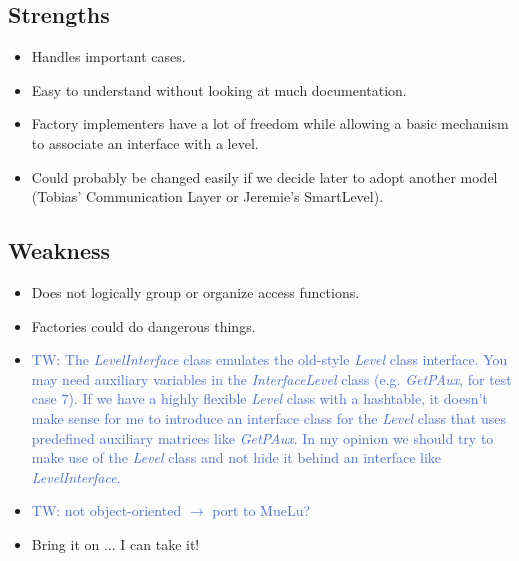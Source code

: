\documentclass{siamltex}
\numberwithin{algorithm}{section}  %
\newcommand{\TW}[1]{\textcolor{RoyalBlue}{TW: #1}}
\begin{document}
\subsection{Strengths}
\begin{itemize}
\item Handles important cases.
\item Easy to understand without looking at much documentation.
\item Factory implementers have a lot of freedom while allowing a
      basic mechanism to associate an interface with a level.
\item Could probably be changed easily if we decide later to adopt another
      model (Tobias' Communication Layer or Jeremie's SmartLevel).
\end{itemize}
\subsection{Weakness}
\begin{itemize}
\item Does not logically group or organize access functions.
\item Factories could do dangerous things.
\item \TW{The \textit{LevelInterface} class emulates the old-style \textit{Level} class interface. You may need auxiliary variables in the \textit{InterfaceLevel} class (e.g. \textit{GetPAux}, for test case 7). If we have a highly flexible \textit{Level} class with a hashtable, it doesn't make sense for me to introduce an interface class for the \textit{Level} class that uses predefined auxiliary matrices like \textit{GetPAux}. In my opinion we should try to make use of the \textit{Level} class and not hide it behind an interface like \textit{LevelInterface}.}
\item \TW{not object-oriented $\rightarrow$ port to MueLu?}
\item Bring it on ... I can take it!
\end{itemize}
\end{document}
